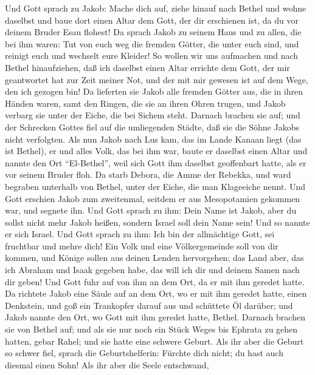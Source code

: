  Und Gott sprach zu Jakob: Mache dich auf, ziehe hinauf
nach Bethel und wohne daselbst und baue dort einen Altar dem Gott, der
dir erschienen ist, da du vor deinem Bruder Esau flohest! 
Da sprach Jakob zu seinem Haus und zu allen, die bei ihm waren: Tut von
euch weg die fremden Götter, die unter euch sind, und reinigt euch und
wechselt eure Kleider!  So wollen wir uns aufmachen und
nach Bethel hinaufziehen, daß ich daselbst einen Altar errichte dem
Gott, der mir geantwortet hat zur Zeit meiner Not, und der mit mir
gewesen ist auf dem Wege, den ich gezogen bin!  Da
lieferten sie Jakob alle fremden Götter aus, die in ihren Händen waren,
samt den Ringen, die sie an ihren Ohren trugen, und Jakob verbarg sie
unter der Eiche, die bei Sichem steht.  Darnach brachen
sie auf; und der Schrecken Gottes fiel auf die umliegenden Städte, daß
sie die Söhne Jakobs nicht verfolgten.  Als nun Jakob nach
Lus kam, das im Lande Kanaan liegt (das ist Bethel), er und alles Volk,
das bei ihm war,  baute er daselbst einen Altar und nannte
den Ort ``El-Bethel'', weil sich Gott ihm daselbst geoffenbart hatte,
als er vor seinem Bruder floh.  Da starb Debora, die Amme
der Rebekka, und ward begraben unterhalb von Bethel, unter der Eiche,
die man Klageeiche nennt.  Und Gott erschien Jakob zum
zweitenmal, seitdem er aus Mesopotamien gekommen war, und segnete ihn.
 Und Gott sprach zu ihm: Dein Name ist Jakob, aber du
sollst nicht mehr Jakob heißen, sondern Israel soll dein Name sein! Und
so nannte er sich Israel.  Und Gott sprach zu ihm: Ich
bin der allmächtige Gott, sei fruchtbar und mehre dich! Ein Volk und
eine Völkergemeinde soll von dir kommen, und Könige sollen aus deinen
Lenden hervorgehen;  das Land aber, das ich Abraham und
Isaak gegeben habe, das will ich dir und deinem Samen nach dir geben!
 Und Gott fuhr auf von ihm an dem Ort, da er mit ihm
geredet hatte.  Da richtete Jakob eine Säule auf an dem
Ort, wo er mit ihm geredet hatte, einen Denkstein, und goß ein
Trankopfer darauf aus und schüttete Öl darüber;  und
Jakob nannte den Ort, wo Gott mit ihm geredet hatte, Bethel.
 Darnach brachen sie von Bethel auf; und als sie nur noch
ein Stück Weges bis Ephrata zu gehen hatten, gebar Rahel; und sie hatte
eine schwere Geburt.  Als ihr aber die Geburt so schwer
fiel, sprach die Geburtshelferin: Fürchte dich nicht; du hast auch
diesmal einen Sohn!  Als ihr aber die Seele entschwand,
